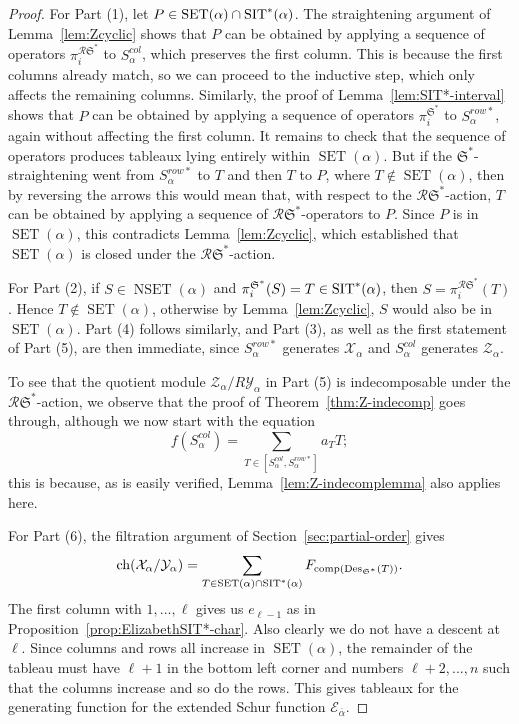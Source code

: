 \documentclass[12pt,letterpaper]{amsart}
\theoremstyle{definition}
\DeclareMathOperator{\comp}{comp}
\newcommand{\dI}{\mathfrak{S}^*}
\newcommand{\rdI}{\mathcal{R}\mathfrak{S}^*}
\DeclareMathOperator{\Des}{Des}
\newcommand{\SET}{\ensuremath{\operatorname{SET}}} \newcommand{\NSET}{\ensuremath{\operatorname{NSET}}}\newcommand{\SRCT}{\ensuremath{\operatorname{SRCT}}}
\begin{document}
\begin{proof} For Part (1), let $P\in \SET(\alpha)\cap\SIT^*(\alpha)$.  The straightening argument of Lemma~\ref{lem:Zcyclic} shows that $P$  can be obtained by applying a sequence of operators $\pi^{\rdI}_i$ to $S^{col}_\alpha$, which preserves the first column.  This is because the first columns already match, so we can proceed to the inductive step, which only affects the remaining columns.   Similarly, the proof of Lemma~\ref{lem:SIT*-interval} shows that $P$ can be obtained by applying a sequence of operators $\pi^{\dI}_i$ to $S^{row*}_\alpha$, again without affecting the first column.   It remains to check that the sequence of operators produces tableaux lying entirely within $\SET(\alpha)$. But if  the $\dI$-straightening went from $S^{row*}_\alpha $ to $T$ and then $T$ to $P$, where $T\notin \SET(\alpha)$, then by reversing the arrows this would mean that, with respect to the $\rdI$-action, $T$ can be obtained by applying a sequence of $\rdI$-operators to $P$. Since $P$ is in $\SET(\alpha)$, this contradicts Lemma~\ref{lem:Zcyclic}, which established that $\SET(\alpha)$ is closed under the $\rdI$-action.

For Part (2), if $S\in \NSET(\alpha)$ and $\pi_i^{\dI}(S)=T\in\SIT^*(\alpha)$, then $S=\pi_i^{\rdI}(T)$.  Hence $T\notin \SET(\alpha)$, otherwise by Lemma~\ref{lem:Zcyclic}, $S$ would also be in $\SET(\alpha)$.   Part (4) follows similarly, and Part (3), as well as the first statement of Part (5), are then 
immediate, since $S^{row*}_\alpha$ generates $\mathcal{X}_\alpha$ and $S^{col}_\alpha$ generates $\mathcal{Z}_\alpha$.

To see that the quotient module $\mathcal{Z}_\alpha/R{\mathcal{Y}}_\alpha$ in Part (5) is indecomposable under the $\rdI$-action, we observe that  the proof of Theorem~\ref{thm:Z-indecomp} goes through, although we now start with the equation 
\[ f(S^{col}_\alpha)=\sum_{T\in [S^{col}_\alpha, S^{row*}_\alpha]} a_T T;\]
this is because, as is easily verified,  Lemma~\ref{lem:Z-indecomplemma} also applies here.

For Part (6),  the  filtration argument of Section~\ref{sec:partial-order} gives 
\[\chr(\mathcal{X}_\alpha/\mathcal{Y}_\alpha)=\sum_{T\in \SET(\alpha)\cap\SIT^*(\alpha)} F_{\comp(\Des_{\dI}(T))}.\]
The first column with $1,\ldots,\ell$ gives us $e_{\ell -1}$ as in Proposition~\ref{prop:ElizabethSIT*-char}. Also clearly we do not have a descent at $\ell$.
Since columns and rows all increase in $\SET(\alpha)$, the remainder of the tableau must have $\ell+1$ in the bottom left corner and numbers $\ell+2, ..., n$ such that the columns increase and so do the rows. This gives tableaux for the generating function for the extended Schur function $\mathcal{E} _{\overline{\alpha}}$. 


\end{proof}
\end{document}

